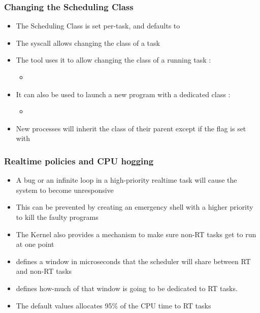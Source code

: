 \begin{frame}
	\frametitle{Changing the Scheduling Class}
	\begin{itemize}
		\item The Scheduling Class is set per-task, and defaults to 
		\item The  syscall allows changing the class of a task
		\item The tool  uses it to allow changing the class of a running task :
			\begin{itemize}
				\item {}
			\end{itemize}
		\item It can also be used to launch a new program with a dedicated class :
			\begin{itemize}
				\item {}
			\end{itemize}
		\item New processes will inherit the class of their parent except if the  flag is set with 
	\end{itemize}
\end{frame}

\begin{frame}
	\frametitle{Realtime policies and CPU hogging}
	\begin{itemize}
		\item A bug or an infinite loop in a high-priority realtime task will cause the system to become unresponsive
		\item This can be prevented by creating an emergency shell with a higher priority to kill the faulty programs
		\item The Kernel also provides a mechanism to make sure non-RT tasks get to run at one point
		\item {} defines a window in microseconds that the scheduler will share between RT and non-RT tasks
		\item {} defines how-much of that window is going to be dedicated to RT tasks.
		\item The default values allocates 95\% of the CPU time to RT tasks
	\end{itemize}
\end{frame}

